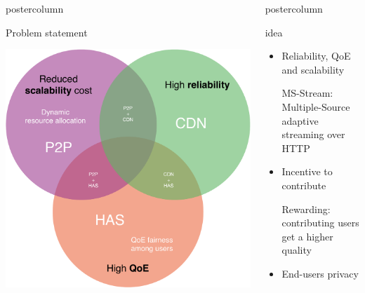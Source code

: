 \begin{frame}
\begin{columns}
\begin{column}{.49\textwidth}
\begin{beamercolorbox}[center,wd=\textwidth]{postercolumn}
\begin{minipage}[T]{.95\textwidth}
{            \vfill
            
            \begin{block}{Problem statement}
            
            \centering
            
            \includegraphics[width=.5\textwidth]{sample/SotA-cropped.pdf}
            
            \end{block}
            
          }
        \end{minipage}
      \end{beamercolorbox}
    \end{column}
    \begin{column}{.49\textwidth}
      \begin{beamercolorbox}[center,wd=\textwidth]{postercolumn}
        \begin{minipage}[T]{.95\textwidth}
          \parbox[t][\columnheight]{\textwidth}{
            
            \begin{block}{\pname idea}
            
            \begin{itemize}
            
            \item Reliability, QoE and scalability
            
            MS-Stream: Multiple-Source adaptive streaming over HTTP
            
            \item Incentive to contribute
            
            Rewarding: contributing users get a higher quality
            
            \item End-users privacy
            

\end{itemize}
\end{block}}
\end{minipage}
\end{beamercolorbox}
\end{column}
\end{columns}
\end{frame}
